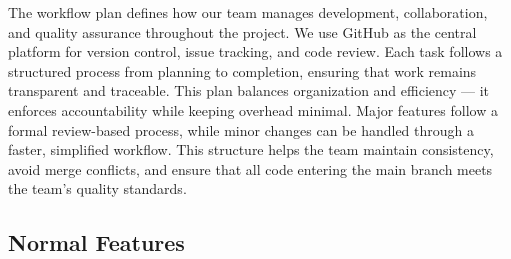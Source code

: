 \documentclass{article}
\begin{document}
The workflow plan defines how our team manages development, collaboration, and quality assurance throughout the project. We use GitHub as the central platform for version control, issue tracking, and code review. Each task follows a structured process from planning to completion, ensuring that work remains transparent and traceable. This plan balances organization and efficiency — it enforces accountability while keeping overhead minimal. Major features follow a formal review-based process, while minor changes can be handled through a faster, simplified workflow. This structure helps the team maintain consistency, avoid merge conflicts, and ensure that all code entering the main branch meets the team’s quality standards.

\subsection{Normal Features}
\end{document}
